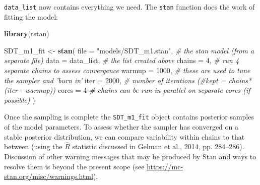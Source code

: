 \documentclass[
  english,
  ,man,floatsintext]{apa6}
\newenvironment{Shaded}{\begin{snugshade}}{\end{snugshade}}
\newcommand{\CommentTok}[1]{\textcolor[rgb]{0.56,0.35,0.01}{\textit{#1}}}
\newcommand{\DataTypeTok}[1]{\textcolor[rgb]{0.13,0.29,0.53}{#1}}
\newcommand{\DecValTok}[1]{\textcolor[rgb]{0.00,0.00,0.81}{#1}}
\newcommand{\KeywordTok}[1]{\textcolor[rgb]{0.13,0.29,0.53}{\textbf{#1}}}
\newcommand{\NormalTok}[1]{#1}
\newcommand{\OperatorTok}[1]{\textcolor[rgb]{0.81,0.36,0.00}{\textbf{#1}}}
\newcommand{\StringTok}[1]{\textcolor[rgb]{0.31,0.60,0.02}{#1}}
\begin{document}
\begin{Shaded}
\end{Shaded}

\texttt{data\_list} now contains everything we need. The \texttt{stan} function does the work of fitting the model:

\begin{Shaded}
\begin{Highlighting}[]
\KeywordTok{library}\NormalTok{(rstan)}

\NormalTok{SDT_m1_fit <-}\StringTok{ }\KeywordTok{stan}\NormalTok{(}
  \DataTypeTok{file =} \StringTok{"models/SDT_m1.stan"}\NormalTok{, }\CommentTok{# the stan model (from a separate file)}
  \DataTypeTok{data =}\NormalTok{ data_list, }\CommentTok{# the list created above}
  \DataTypeTok{chains =} \DecValTok{4}\NormalTok{, }\CommentTok{# run 4 separate chains to assess convergence}
  \DataTypeTok{warmup =} \DecValTok{1000}\NormalTok{, }\CommentTok{# these are used to tune the sampler and 'burn in'}
  \DataTypeTok{iter =} \DecValTok{2000}\NormalTok{, }\CommentTok{# number of iterations (#kept = chains*(iter - warmup))}
  \DataTypeTok{cores =} \DecValTok{4} \CommentTok{# chains can be run in parallel on separate cores (if possible)}
\NormalTok{)}
\end{Highlighting}
\end{Shaded}

Once the sampling is complete the \texttt{SDT\_m1\_fit} object contains posterior samples of the model parameters. To assess whether the sampler has converged on a stable posterior distribution, we can compare variability within chains to that between (using the \(\hat{R}\) statistic discussed in Gelman et al., 2014, pp. 284--286). Discussion of other warning messages that may be produced by Stan and ways to resolve them is beyond the present scope (see \url{https://mc-stan.org/misc/warnings.html}).
\end{document}
